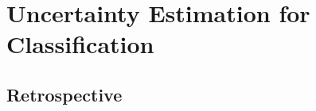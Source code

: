 \chapter{Uncertainty Estimation for Classification}
\label{chap:classification}







\section*{Retrospective}
%
